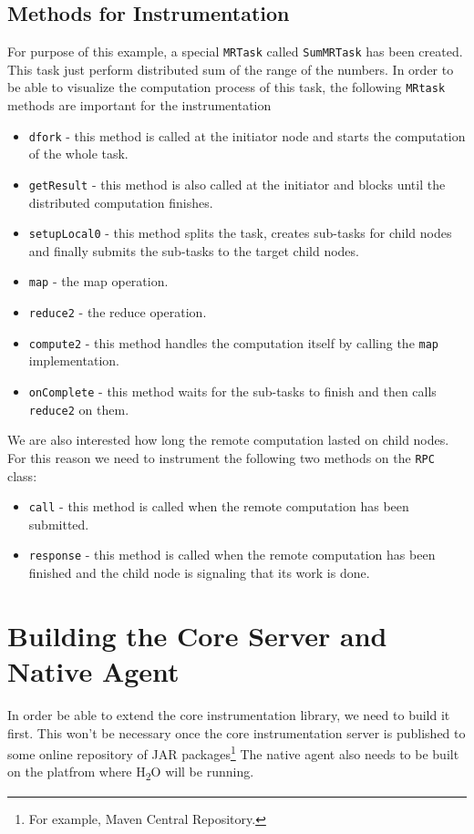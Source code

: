 \subsection{Methods for Instrumentation}
For purpose of this example, a special \texttt{MRTask} called \texttt{SumMRTask} has been created. This task just perform distributed sum of the range of the numbers. In order to be able to visualize the computation process of this task, the following \texttt{MRtask} methods are important for the instrumentation
\begin{itemize}
	\item \texttt{dfork} - this method is called at the initiator node and starts the computation of the whole task.
	\item \texttt{getResult} - this method is also called at the initiator and blocks until the distributed computation finishes.
	\item \texttt{setupLocal0} - this method splits the task, creates sub-tasks for child nodes and finally submits the sub-tasks to the target child nodes.
	\item \texttt{map} - the map operation.
	\item \texttt{reduce2} - the reduce operation.
	\item \texttt{compute2} - this method handles the computation itself by calling the \texttt{map} implementation.
	\item \texttt{onComplete} - this method waits for the sub-tasks to finish and then calls \texttt{reduce2} on them.
\end{itemize}

We are also interested how long the remote computation lasted on child nodes. For this reason we need to instrument the following two methods on the \texttt{RPC} class:
\begin{itemize}
	\item \texttt{call} - this method is called when the remote computation has been submitted.
	\item \texttt{response} - this method is called when the remote computation has been finished and the child node is signaling that its work is done.
\end{itemize}

\section{Building the Core Server and Native Agent}
In order be able to extend the core instrumentation library, we need to build it first. This won't be necessary once the core instrumentation server is published to some online repository of JAR packages\footnote{For example, Maven Central Repository.} The native agent also needs to be built on the platfrom where H\textsubscript{2}O will be running. 

